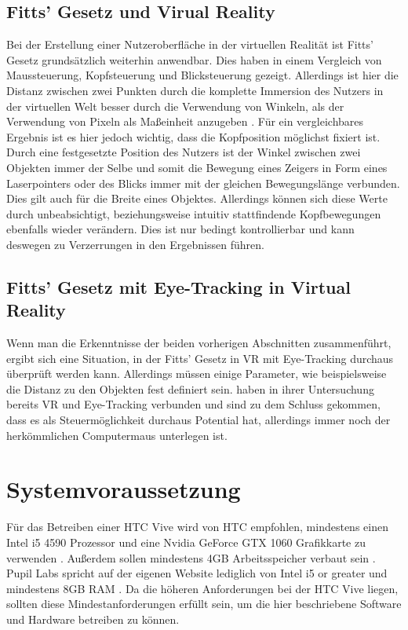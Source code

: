 \subsection{Fitts' Gesetz und Virual Reality}
Bei der Erstellung einer Nutzeroberfläche in der virtuellen Realität ist Fitts' Gesetz grundsätzlich weiterhin anwendbar. Dies haben \citeauthor{Hansen.2018} in einem Vergleich von Maussteuerung, Kopfsteuerung und Blicksteuerung gezeigt.\cite{Hansen.2018} Allerdings ist hier die Distanz zwischen zwei Punkten durch die komplette Immersion des Nutzers in der virtuellen Welt besser durch die Verwendung von Winkeln, als der Verwendung von Pixeln als Maßeinheit anzugeben \cite{Hansen.2018}. Für ein vergleichbares Ergebnis ist es hier jedoch wichtig, dass die Kopfposition möglichst fixiert ist. Durch eine festgesetzte Position des Nutzers ist der Winkel zwischen zwei Objekten immer der Selbe und somit die Bewegung eines Zeigers in Form eines Laserpointers oder des Blicks immer mit der gleichen Bewegungslänge verbunden. Dies gilt auch für die Breite eines Objektes. Allerdings können sich diese Werte durch unbeabsichtigt, beziehungsweise intuitiv stattfindende Kopfbewegungen ebenfalls wieder verändern. Dies ist nur bedingt kontrollierbar und kann deswegen zu Verzerrungen in den Ergebnissen führen. 

\subsection{Fitts' Gesetz mit Eye-Tracking in Virtual Reality}
Wenn man die Erkenntnisse der beiden vorherigen Abschnitten zusammenführt, ergibt sich eine Situation, in der Fitts' Gesetz in VR mit Eye-Tracking durchaus überprüft werden kann. Allerdings müssen einige Parameter, wie beispielsweise die Distanz zu den Objekten fest definiert sein. \citeauthor{Hansen.2018} haben in ihrer Untersuchung bereits VR und Eye-Tracking verbunden und sind zu dem Schluss gekommen, dass es als Steuermöglichkeit durchaus Potential hat, allerdings immer noch der herkömmlichen Computermaus unterlegen ist. \cite{Hansen.2018}

\section{Systemvoraussetzung}
Für das Betreiben einer HTC Vive wird von HTC empfohlen, mindestens einen Intel i5 4590 Prozessor und eine Nvidia GeForce GTX 1060 Grafikkarte zu verwenden \cite{sys.requirements.2020}. Außerdem sollen mindestens 4GB Arbeitsspeicher verbaut sein \cite{sys.requirements.2020}. Pupil Labs spricht auf der eigenen Website lediglich von \glqq Intel i5 or greater\grqq{} und mindestens 8GB RAM \cite{PupilLabsSpec}. Da die höheren Anforderungen bei der HTC Vive liegen, sollten diese Mindestanforderungen erfüllt sein, um die hier beschriebene Software und Hardware betreiben zu können. 

